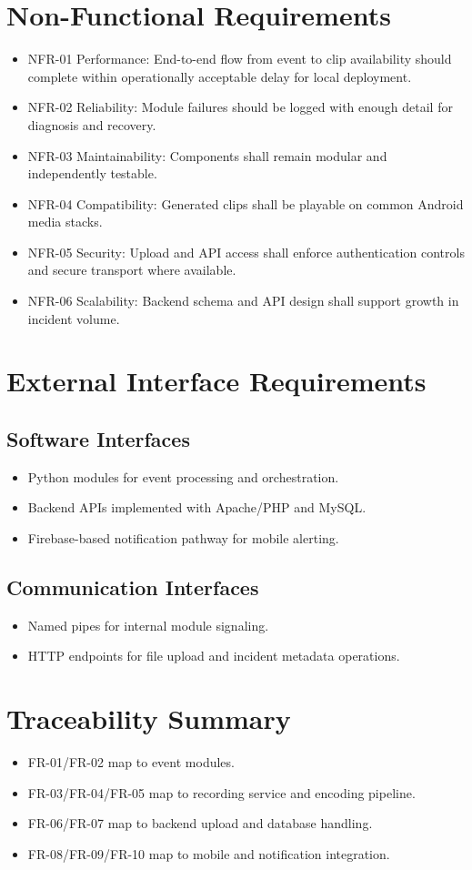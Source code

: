 \section{Non-Functional Requirements}
\begin{itemize}
\item NFR-01 Performance: End-to-end flow from event to clip availability should complete within operationally acceptable delay for local deployment.
\item NFR-02 Reliability: Module failures should be logged with enough detail for diagnosis and recovery.
\item NFR-03 Maintainability: Components shall remain modular and independently testable.
\item NFR-04 Compatibility: Generated clips shall be playable on common Android media stacks.
\item NFR-05 Security: Upload and API access shall enforce authentication controls and secure transport where available.
\item NFR-06 Scalability: Backend schema and API design shall support growth in incident volume.
\end{itemize}

\section{External Interface Requirements}
\subsection{Software Interfaces}
\begin{itemize}
\item Python modules for event processing and orchestration.
\item Backend APIs implemented with Apache/PHP and MySQL.
\item Firebase-based notification pathway for mobile alerting.
\end{itemize}

\subsection{Communication Interfaces}
\begin{itemize}
\item Named pipes for internal module signaling.
\item HTTP endpoints for file upload and incident metadata operations.
\end{itemize}

\section{Traceability Summary}
\begin{itemize}
\item FR-01/FR-02 map to event modules.
\item FR-03/FR-04/FR-05 map to recording service and encoding pipeline.
\item FR-06/FR-07 map to backend upload and database handling.
\item FR-08/FR-09/FR-10 map to mobile and notification integration.
\end{itemize}